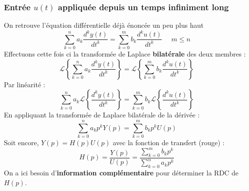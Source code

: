 		\subsubsection{Entrée $u(t)$ appliquée depuis un temps infiniment long}
		On retrouve l'équation différentielle déjà énoncée un peu plus haut
		\begin{equation}
		\sum_{k=0}^n a_k\dfrac{d^ky(t)}{dt^k} = \sum_{k=0}^m b_k\dfrac{d^ku(t)}{dt^k}\ \ \ \ \ \
		m\leq n
		\end{equation}
		Effectuons cette fois ci la transformée de Laplace \textbf{bilatérale} des deux membres :
		\begin{equation}
		\mathcal{L}\left\{\sum_{k=0}^n a_k\dfrac{d^ky(t)}{dt^k}\right\} =	\mathcal{L}\left\{
		\sum_{k=0}^m b_k\dfrac{d^ku(t)}{dt^k}\right\}
		\end{equation}
		Par linéarité :
		\begin{equation}
		\sum_{k=0}^n a_k\mathcal{L}\left\{\dfrac{d^ky(t)}{dt^k}\right\} =	\sum_{k=0}^m b_k
		\mathcal{L}\left\{\dfrac{d^ku(t)}{dt^k}\right\}
		\end{equation}
		En appliquant la transformée de Laplace bilatérale de la dérivée :
		\begin{equation}
		\sum_{k=0}^n a_kp^kY(p) = \sum_{k=0}^m b_kp^kU(p)
		\end{equation}
		Soit encore, $Y(p) = H(p)U(p)$ avec la fonction de transfert (rouge) :
		\begin{equation}
		H(p) = \frac{Y(p)}{U(p)} = \frac{\sum_{k=0}^m b_kp^k}{\sum_{k=0}^n a_kp^k}
		\end{equation}
		On a ici besoin d'\textbf{information complémentaire} pour déterminer la RDC de $H(p)$.	
		

